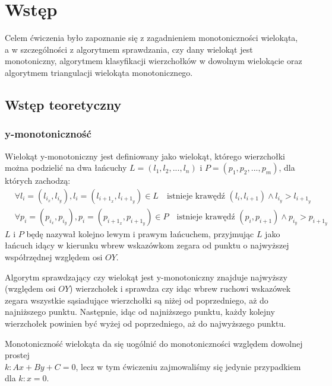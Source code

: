 \documentclass[11pt,a4paper]{article}
\begin{document}
\section{Wstęp}
Celem ćwiczenia było zapoznanie się z zagadnieniem
monotoniczności wielokąta, a w szczególności
z algorytmem sprawdzania, czy dany wielokąt jest monotoniczny, algorytmem
klasyfikacji wierzchołków w dowolnym wielokącie 
oraz algorytmem triangulacji wielokąta monotonicznego.

\subsection{Wstęp teoretyczny}
\subsubsection{y-monotoniczność}
Wielokąt y-monotoniczny jest definiowany jako wielokąt,
którego wierzchołki można podzielić na dwa łańcuchy
$L = (l_1, l_2, ..., l_n)$ i $P = (p_1, p_2, ..., p_m)$,
dla których zachodzą:
\begin{equation}
    \begin{split}
    &\forall 
    l_i = (l_{i_x}, l_{i_y}), l_i = (l_{{i + 1}_x}, l_{{i + 1}_y})
    \in L
    \quad \text{istnieje krawędź }(l_i, l_{i + 1})
    \land
    l_{i_y} > l_{{i + 1}_y}
    \\
    &\forall
    p_i = (p_{i_x}, p_{i_y}), p_i = (p_{{i + 1}_x}, p_{{i + 1}_y})
    \in P
    \quad \text{istnieje krawędź }(p_i, p_{i + 1})
    \land
    p_{i_y} > p_{{i + 1}_y}
    \end{split}
\end{equation}
$L$ i $P$ będę nazywał kolejno lewym i prawym łańcuchem, przyjmując
$L$ jako łańcuch idący w kierunku wbrew wskazówkom zegara od punktu
o najwyższej współrzędnej względem osi $OY$.

Algorytm sprawdzający czy wielokąt jest y-monotoniczny znajduje najwyższy
(względem osi $OY$) wierzchołek i sprawdza czy idąc wbrew ruchowi wskazówek
zegara wszystkie sąsiadujące wierzchołki są niżej od poprzedniego, aż do
najniższego punktu. Następnie, idąc od najniższego punktu, każdy kolejny
wierzchołek powinien być wyżej od poprzedniego, aż do najwyższego punktu.

Monotoniczność wielokąta da się uogólnić do monotoniczności względem
dowolnej prostej \\ $k: Ax + By + C = 0$, lecz w tym ćwiczeniu zajmowaliśmy się 
jedynie przypadkiem dla $k: x = 0$.
\end{document}
